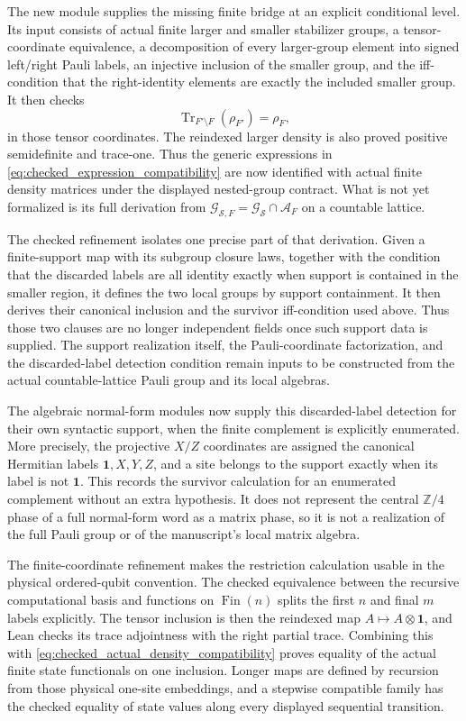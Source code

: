 \documentclass[11pt,reqno]{amsart}
\numberwithin{equation}{section}
\theoremstyle{definition}
\theoremstyle{remark}
\newcommand{\cA}{\mathcal A}
\newcommand{\cG}{\mathcal G}
\newcommand{\cS}{\mathcal S}
\newcommand{\id}{\mathbf 1}
\newcommand{\Tr}{\operatorname{Tr}}
\begin{document}
The new module  supplies the missing finite
bridge at an explicit conditional level.  Its input consists of actual finite
larger and smaller stabilizer groups, a tensor-coordinate equivalence, a
decomposition of every larger-group element into signed left/right Pauli
labels, an injective inclusion of the smaller group, and the iff-condition
that the right-identity elements are exactly the included smaller group.  It
then checks
\begin{equation}
  \Tr_{F'\setminus F}(\rho_{F'})=\rho_F,
  \label{eq:checked_actual_density_compatibility}
\end{equation}
in those tensor coordinates.  The reindexed larger density is also proved
positive semidefinite and trace-one.  Thus the generic expressions in
\eqref{eq:checked_expression_compatibility} are now identified with actual
finite density matrices under the displayed nested-group contract.  What is
not yet formalized is its full derivation from
$\cG_{\cS,F}=\cG_{\cS}\cap\cA_F$ on a countable lattice.

The checked refinement  isolates one
precise part of that derivation.  Given a finite-support map with its subgroup
closure laws, together with the condition that the discarded labels are all
identity exactly when support is contained in the smaller region, it defines
the two local groups by support containment.  It then derives their canonical
inclusion and the survivor iff-condition used above.  Thus those two clauses
are no longer independent fields once such support data is supplied.  The
support realization itself, the Pauli-coordinate factorization, and the
discarded-label detection condition remain inputs to be constructed from the
actual countable-lattice Pauli group and its local algebras.

The algebraic normal-form modules now supply this discarded-label detection
for their own syntactic support, when the finite complement is explicitly
enumerated.  More precisely, the projective $X/Z$ coordinates are assigned
the canonical Hermitian labels $\id,X,Y,Z$, and a site belongs to the support
exactly when its label is not $\id$.  This records the survivor calculation
for an enumerated complement without an extra hypothesis.  It does not
represent the central $\mathbb Z/4$ phase of a full normal-form word as a
matrix phase, so it is not a realization of the full Pauli group or of the
manuscript's local matrix algebra.

The finite-coordinate refinement makes the restriction calculation usable in
the physical ordered-qubit convention.  The checked equivalence between the
recursive computational basis and functions on $\operatorname{Fin}(n)$ splits
the first $n$ and final $m$ labels explicitly.  The tensor inclusion is then
the reindexed map $A\mapsto A\otimes\id$, and Lean checks its trace adjointness
with the right partial trace.  Combining this with
\eqref{eq:checked_actual_density_compatibility} proves equality of the actual
finite state functionals on one inclusion.  Longer maps are defined by
recursion from those physical one-site embeddings, and a stepwise compatible
family has the checked equality of state values along every displayed
sequential transition.
\end{document}
